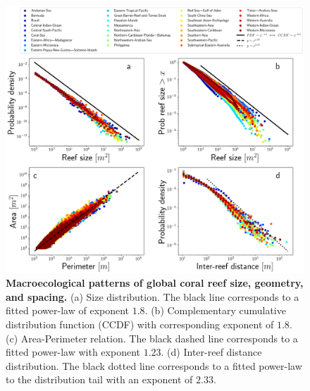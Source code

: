 \begin{figure}[H]
    \centering
    \includegraphics[width=\textwidth]{Figures/general_analysis.png}
    \caption[Macroecological patterns of global coral reef size,
        geometry and spacing]{\textbf{Macroecological patterns of global coral
            reef size, geometry, and spacing.} (a) Size distribution. The black
        line corresponds to a fitted power-law of exponent $1.8$. (b)
        Complementary cumulative distribution function (CCDF) with
        corresponding exponent of $1.8$. (c) Area-Perimeter relation. The black
        dashed line corresponds to a fitted power-law with exponent $1.23$. (d)
        Inter-reef distance distribution. The black dotted line corresponds
        to a fitted power-law to the distribution tail with an exponent of
        $2.33$.}
    \label{fig:general_analysis}
\end{figure}

